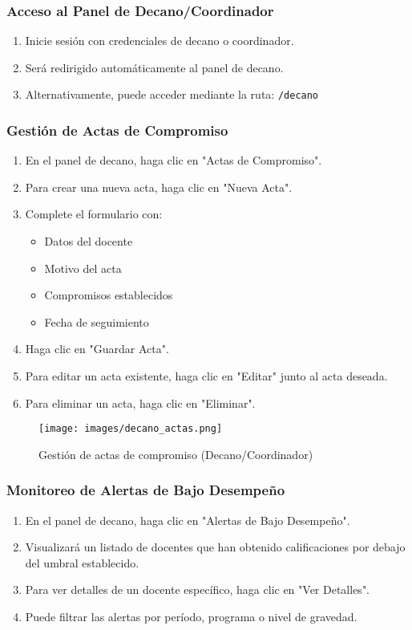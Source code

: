 \documentclass[12pt,a4paper]{article}
\begin{document}
\subsubsection{Acceso al Panel de Decano/Coordinador}
\begin{enumerate}
    \item Inicie sesión con credenciales de decano o coordinador.
    \item Será redirigido automáticamente al panel de decano.
    \item Alternativamente, puede acceder mediante la ruta: \texttt{/decano}
\end{enumerate}

\subsubsection{Gestión de Actas de Compromiso}
\begin{enumerate}
    \item En el panel de decano, haga clic en "Actas de Compromiso".
    \item Para crear una nueva acta, haga clic en "Nueva Acta".
    \item Complete el formulario con:
    \begin{itemize}
        \item Datos del docente
        \item Motivo del acta
        \item Compromisos establecidos
        \item Fecha de seguimiento
    \end{itemize}
    \item Haga clic en "Guardar Acta".
    \item Para editar un acta existente, haga clic en "Editar" junto al acta deseada.
    \item Para eliminar un acta, haga clic en "Eliminar".
\end{enumerate}

\begin{figure}[H]
  \centering
  \texttt{[image: images/decano\_actas.png]}
  \caption{Gestión de actas de compromiso (Decano/Coordinador)}
  \label{fig:decano_actas}
\end{figure}


\subsubsection{Monitoreo de Alertas de Bajo Desempeño}
\begin{enumerate}
    \item En el panel de decano, haga clic en "Alertas de Bajo Desempeño".
    \item Visualizará un listado de docentes que han obtenido calificaciones por debajo del umbral establecido.
    \item Para ver detalles de un docente específico, haga clic en "Ver Detalles".
    \item Puede filtrar las alertas por período, programa o nivel de gravedad.
\end{enumerate}
\end{document}
